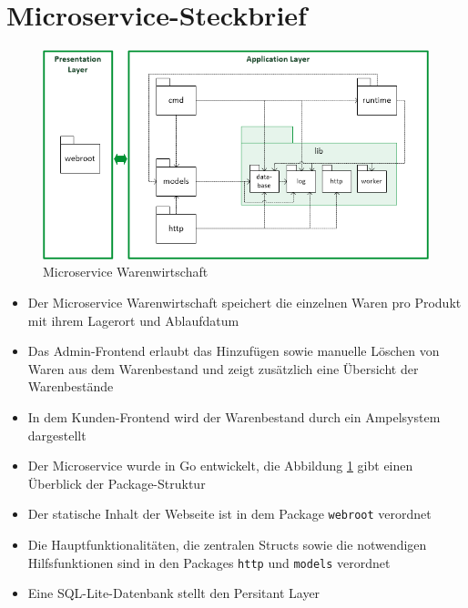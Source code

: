 \section{Microservice-Steckbrief}
\label{sec: Microservice-Steckbrief}

\begin{figure}[H]
	\begin{center}
	\includegraphics[width=0.95 \textwidth]{./pics/struktur.png}
	\end{center}
	\caption{Microservice Warenwirtschaft}
	\label{pic: Microservice Warenwirtschaft}
\end{figure}


\begin{itemize}
	\item Der Microservice Warenwirtschaft speichert die einzelnen Waren pro Produkt mit ihrem Lagerort und Ablaufdatum
	\item Das Admin-Frontend erlaubt das Hinzufügen sowie manuelle Löschen von Waren aus dem Warenbestand und zeigt zusätzlich eine Übersicht der Warenbestände
	\item In dem Kunden-Frontend wird der Warenbestand durch ein Ampelsystem dargestellt
	\item Der Microservice wurde in Go entwickelt, die Abbildung \ref{pic: Microservice Warenwirtschaft} gibt einen Überblick der Package-Struktur
	\item Der statische Inhalt der Webseite ist in dem Package \texttt{webroot} verordnet
	\item Die Hauptfunktionalitäten, die zentralen Structs sowie die notwendigen Hilfsfunktionen sind in den Packages \texttt{http} und \texttt{models} verordnet
	\item Eine SQL-Lite-Datenbank stellt den Persitant Layer
\end{itemize}
